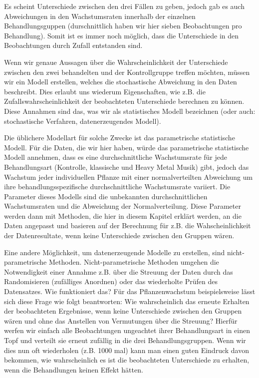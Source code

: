 \documentclass[a4paper,twoside]{tufte-book}\usepackage[]{graphicx}\usepackage[]{color}
\begin{document}
Es scheint Unterschiede zwischen den drei Fällen zu geben, jedoch gab es auch Abweichungen in den Wachstumsraten innerhalb der einzelnen Behandlungsguppen (durschnittlich haben wir hier sieben Beobachtungen pro Behandlung). Somit ist es immer noch möglich, dass die Unterschiede in den Beobachtungen durch Zufall entstanden sind.

Wenn wir genaue Aussagen über die Wahrscheinlichkeit der Unterschiede zwischen den zwei behandelten und der Kontrollgruppe treffen möchten, müssen wir ein Modell erstellen, welches die stochastische Abweichung in den Daten beschreibt. Dies erlaubt uns wiederum Eigenschaften, wie z.B. die Zufallswahrscheinlichkeit der beobachteten Unterschiede berechnen zu können. Diese Annahmen sind das, was wir als statistisches Modell bezeichnen (oder auch: stochastische Verfahren, datenerzeugendes Modell). 

Die üblichere Modellart für solche Zwecke ist das parametrische statistische Modell. Für die Daten, die wir hier haben, würde das parametrische statistische Modell annehmen, dass es eine durchschnittliche Wachstumsrate für jede Behandlungsart (Kontrolle, klassische und Heavy Metal Musik) gibt, jedoch das Wachstum jeder individuellen Pflanze mit einer normalverteilten Abweichung um ihre behandlungsspezifische durchschnittliche Wachstumsrate variiert. Die Parameter dieses Modells sind die unbekannten durchschnittlichen Wachstumsraten und die Abweichung der Normalverteilung. Diese Parameter werden dann mit Methoden, die hier in diesem Kapitel erklärt werden, an die Daten angepasst und basieren auf der Berechnung für z.B. die Wahscheinlichkeit der Datenresultate, wenn keine Unterschiede zwischen den Gruppen wären.

Eine andere Möglichkeit, um datenerzeugende Modelle zu erstellen, sind nicht-parametrische Methoden. Nicht-parametrische Methoden umgehen die Notwendigkeit einer Annahme z.B. über die Streuung der Daten durch das Randomisieren (zufälliges Anordnen) oder das wiederholte Prüfen des Datensatzes. Wie funktioniert das? Für das Pflanzenwachstum beispielsweise lässt sich diese Frage wie folgt beantworten: Wie wahrscheinlich das erneute Erhalten der beobachteten Ergebnisse, wenn keine Unterschiede zwischen den Gruppen wären und ohne das Anstellen von Vermutungen über die Streuung? Hierfür werfen wir einfach alle Beobachtungen ungeachtet ihrer Behandlungsart in einen Topf und verteilt sie erneut zufällig in die drei Behandlungsgruppen. Wenn wir dies nun oft wiederholen (z.B. 1000 mal) kann man einen guten Eindruck davon bekommen, wie wahrscheinlich es ist die beobachteten Unterschiede zu erhalten, wenn die Behandlungen keinen Effekt hätten.
\end{document}
